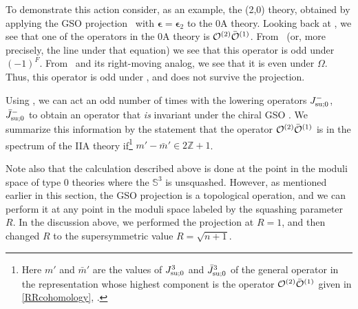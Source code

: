 \documentclass[12pt]{article}
\def\epsilonb{{\boldsymbol\epsilon}}
\newcommand{\bS}{{\mathbb S}}
\numberwithin{equation}{section}
\begin{document}
To demonstrate this action consider, as an example, the (2,0) theory, obtained by applying the GSO projection \chiralGSO\ with $\epsilonb=\epsilonb_2$ to the 0A theory. Looking back at \GSOeven, we see that one of the operators in the 0A theory is ${\cal O}^{(2)} \bar{{\cal O}}^{(1)}$. From \actionepsilon\ (or, more precisely, the line under that equation) we see that this operator is odd under $(-1)^F$. From \OmegaLOi\ and its right-moving analog, we see that it is even under $\Omega$. Thus, this operator is odd under \chiralGSO, and does not survive the projection.

Using \OmegaLJm, we can act an odd number of times with the lowering operators $J^-_{\rm su;0}$, $\bar J^-_{\rm su;0}$ to obtain an operator that {\it is} invariant under the chiral GSO \chiralGSO. We summarize this information by the statement that the operator ${\cal O}^{(2)} \bar{{\cal O}}^{(1)}$ is in the spectrum of the IIA theory if\footnote{Here $m'$ and $\bar m'$ are the values of $J^3_{\rm su;0}$ and $\bar J^3_{\rm su;0}$ of the general operator in the representation whose highest component is the operator ${\cal O}^{(2)} \bar{{\cal O}}^{(1)}$ given in \eqref{RRcohomology}, \GSOeven.} $m'-\bar m'\in2\mathbb{Z}+1$. 

Note also that the calculation described above is done at the point in the moduli space of type 0 theories where the $\bS^3$ is unsquashed. However, as mentioned earlier in this section, the GSO projection is a topological operation, and we can perform it at any point in the moduli space labeled by the squashing parameter $R$. In the discussion above, we  performed the projection at $R=1$, and then changed $R$ to the supersymmetric value $R=\sqrt{n+1}$. 
\end{document}
